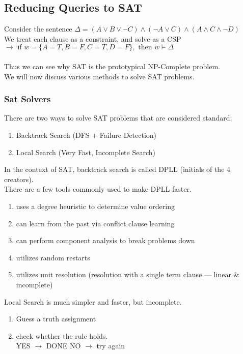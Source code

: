 \documentclass[../../lecture_notes.tex]{subfiles}
\begin{document}
\subsection*{Reducing Queries to SAT}
\noindent Consider the sentence $\Delta = (A \lor B \lor \neg C) \land (\neg A \lor C) \land (A \land C \land \neg D)$\\
We treat each clause as a constraint, and solve as a CSP\\
\indent $\rightarrow \text{ if } w = \{A=T, B=F, C=T, D=F\}, \text{ then } w \models \Delta$\\
\\
Thus we can see why SAT is the prototypical NP-Complete problem.\\
We will now discuss various methods to solve SAT problems.
 
\subsubsection*{Sat Solvers}
\noindent There are two ways to solve SAT problems that are considered standard:
\begin{enumerate} [itemsep=0mm]
	\item Backtrack Search (DFS + Failure Detection)
	\item Local Search (Very Fast, Incomplete Search)
 \end{enumerate}
\noindent In the context of SAT, backtrack search is called DPLL (initials of the 4 creators).\\
There are a few tools commonly used to make DPLL faster.
\begin{enumerate} [itemsep=0mm]
	\item uses a degree heuristic to determine value ordering
	\item can learn from the past via conflict clause learning
	\item can perform component analysis to break problems down
	\item utilizes random restarts 
	\item utilizes unit resolution (resolution with a single term clause — linear \& incomplete)
\end{enumerate}

\noindent Local Search is much simpler and faster, but incomplete.
\begin{enumerate} [itemsep=0mm]
	\item Guess a truth assignment
	\item check whether the rule holds.\\
		YES $\rightarrow$ DONE
		NO $\rightarrow$ try again
\end{enumerate}
\end{document}
